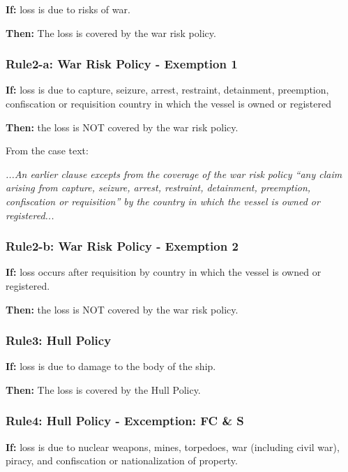     \textbf{If:} loss is due to risks of war.
    
    \textbf{Then:} The loss is covered by the war risk policy.

\subsubsection{Rule2-a: War Risk Policy - Exemption 1}

    \textbf{If:} loss is due to capture, seizure, arrest, restraint, detainment, preemption, confiscation or requisition country in which the vessel is owned or registered
    
    \textbf{Then:} the loss is NOT covered by the war risk policy.
    
    From the case text:
    
    \textit{
    ...An earlier clause excepts
    from the coverage of the war risk policy “any claim arising from capture, seizure,
    arrest, restraint, detainment, preemption, confiscation or requisition” by the
    country in which the vessel is owned or registered...
    }

\subsubsection{Rule2-b: War Risk Policy - Exemption 2}

    \textbf{If:} loss occurs after requisition by country in which the vessel is owned or registered.
    
    \textbf{Then:} the loss is NOT covered by the war risk policy.
    
\subsubsection{Rule3: Hull Policy}

    
    \textbf{If:} loss is due to damage to the body of the ship. 
    
    \textbf{Then:} The loss is covered by the Hull Policy.

\subsubsection{ Rule4: Hull Policy - Excemption: FC \& S}

    
    \textbf{If:} loss is due to nuclear weapons, mines, torpedoes, war (including civil war), piracy, and confiscation or nationalization of property.
    

